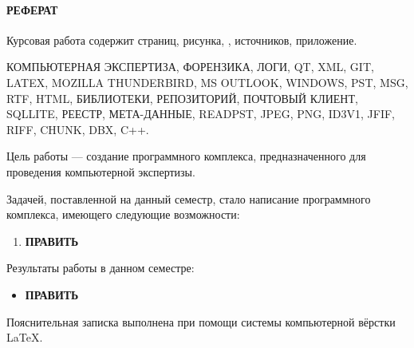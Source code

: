 \newpage
{}
\paragraph{\hfill РЕФЕРАТ \hfill}
Курсовая работа содержит  страниц,  рисунка, ,  источников,  приложение.


КОМПЬЮТЕРНАЯ ЭКСПЕРТИЗА, ФОРЕНЗИКА, ЛОГИ, QT, XML, GIT, LATEX, MOZILLA THUNDERBIRD, MS OUTLOOK, WINDOWS, PST, MSG, RTF, HTML, БИБЛИОТЕКИ, РЕПОЗИТОРИЙ, ПОЧТОВЫЙ КЛИЕНТ, SQLLITE, РЕЕСТР, МЕТА-ДАННЫЕ, READPST, JPEG, PNG, ID3V1, JFIF, RIFF, CHUNK, DBX, C++.

Цель работы --- создание программного комплекса, предназначенного для проведения компьютерной экспертизы.

Задачей, поставленной на данный семестр, стало написание программного комплекса, имеющего следующие возможности: 
\begin{enumerate}
\item \textbf{ПРАВИТЬ}
\end{enumerate}

Результаты работы в данном семестре:

\begin{itemize}
\item \textbf{ПРАВИТЬ}
\end{itemize}

Пояснительная записка выполнена при помощи системы компьютерной вёрстки \LaTeX.
